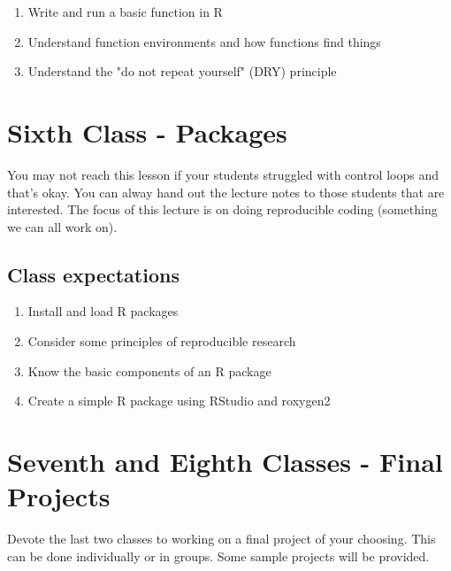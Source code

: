 \documentclass[paper=a4, fontsize=11pt]{scrartcl} %
\numberwithin{equation}{section} %
\numberwithin{figure}{section} %
\numberwithin{table}{section} %
\begin{document}
\begin{enumerate}
\item Write and run a basic function in R
\item Understand function environments and how functions find things
\item Understand the "do not repeat yourself" (DRY) principle 
\end{enumerate}


\section{Sixth Class - Packages}

You may not reach this lesson if your students struggled with control loops and that's okay. You can alway hand out the lecture notes to those students that are interested. The focus of this lecture is on doing reproducible coding (something we can all work on). 


\subsection{Class expectations}

\begin{enumerate}
\item Install and load R packages
\item Consider some principles of reproducible research
\item Know the basic components of an R package
\item Create a simple R package using RStudio and roxygen2 
\end{enumerate}


\section{Seventh and Eighth Classes - Final Projects}

Devote the last two classes to working on a final project of your choosing. This can be done individually or in groups. Some sample projects will be provided.  

\end{document}
